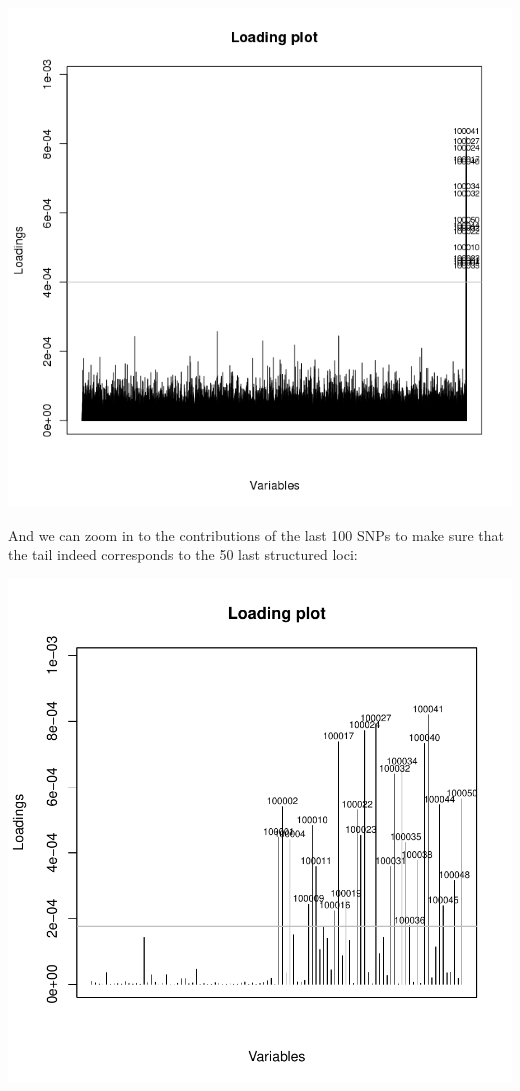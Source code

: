 \documentclass{article}
\begin{document}
\begin{center}
  \includegraphics{figs/loadingplotGL}
\end{center}

\noindent And we can zoom in to the contributions of the last 100 SNPs to make sure that the tail indeed
corresponds to the 50 last structured loci:
\begin{Schunk}
\end{Schunk}
\includegraphics{figs/genomics-065}
\end{document}
